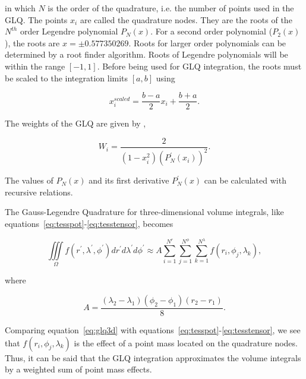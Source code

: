 \documentclass[paper,twocolumn]{geophysics}
\begin{document}
\noindent
in which $N$ is the order of the quadrature,
i.e. the number of points used in the GLQ.
The points $x_i$ are called the quadrature nodes.
They are the roots of the $N^{th}$ order Legendre polynomial $P_N(x)$.
For a second order polynomial ($P_2(x)$),
the roots are $x = \pm 0.577350269$.
Roots for larger order polynomials
can be determined by a root finder algorithm.
Roots of Legendre polynomials
will be within the range $[-1, 1]$.
Before being used for GLQ integration,
the roots must be scaled to the integration limits $[a, b]$ using

\begin{equation}
    x^{scaled}_i = \frac{b - a}{2} x_i + \frac{b + a}{2}.
    \label{eq:glq_scaling}
\end{equation}

The weights of the GLQ are given by \citep{Hildebrand1987},

\begin{equation}
    W_i = \frac{2}{(1 - x_i^2)(P^\prime_N(x_i))^2}.
    \label{eq:glq_weights}
\end{equation}

\noindent
The values of $P_N(x)$ and its first derivative $P^\prime_N(x)$
can be calculated with recursive relations.

The Gauss-Legendre Quadrature for three-dimensional volume integrals,
like equations~\ref{eq:tesspot}-\ref{eq:tesstensor},
becomes \citep{Asgharzadeh2007}

\begin{equation}
    \iiint\limits_{\Omega}
    f(r^\prime, \lambda^\prime, \phi^\prime)
    dr^\prime d\lambda^\prime d\phi^\prime
    \approx
    A
    \sum\limits_{i=1}^{N^r}
    \sum\limits_{j=1}^{N^\phi}
    \sum\limits_{k=1}^{N^\lambda}
    f(r_i, \phi_j, \lambda_k),
    \label{eq:glq3d}
\end{equation}

\noindent
where

\begin{equation}
    A = \frac{(\lambda_2 - \lambda_1)(\phi_2 - \phi_1)(r_2 - r_1)}{8}.
\end{equation}

Comparing equation~\ref{eq:glq3d} with
equations~\ref{eq:tesspot}-\ref{eq:tesstensor},
we see that $f(r_i, \phi_j, \lambda_k)$ is the effect of a point
mass located on the quadrature nodes.
Thus, it can be said that the GLQ integration
approximates the volume integrals  by a
weighted sum of point mass effects.
\end{document}
